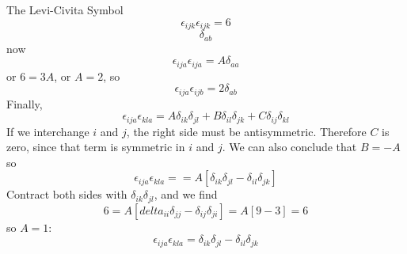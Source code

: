 \documentclass[a4paper,twoside,master.tex]{subfiles}
\begin{document}
\begin{ex}
    \begin{note}{The Levi-Civita Symbol}
        \begin{equation}
            \epsilon_{ijk} \epsilon_{ijk} = 6
        \end{equation}
        \begin{equation}
            [\epsilon_{ija} \epsilon_{ijb} = \delta_{ab} A] \delta_{ab}
        \end{equation}
        now
        \begin{equation}
            \epsilon_{ija} \epsilon_{ija} = A \delta_{aa}
        \end{equation}
        or $ 6 = 3A $, or $ A = 2 $, so
        \begin{equation}
            \epsilon_{ija} \epsilon_{ijb} = 2 \delta_{ab}
        \end{equation}
        Finally,
        \begin{equation}
            \epsilon_{ija} \epsilon_{kla} = A \delta_{ik} \delta_{jl} + B \delta_{il} \delta_{jk} + C \delta_{ij} \delta_{kl}
        \end{equation}
        If we interchange $ i $ and $ j $, the right side must be antisymmetric. Therefore $ C $ is zero, since that term is symmetric in $ i $ and $ j $. We can also conclude that $ B = -A $ so 
        \begin{equation}
            \epsilon_{ija} \epsilon_{kla} = = A \left[ \delta_{ik} \delta_{jl} - \delta_{il} \delta_{jk} \right]
        \end{equation}
        Contract both sides with $ \delta_{ik} \delta_{jl} $, and we find
        \begin{equation}
            6 = A \left[delta_{ii} \delta_{jj} - \delta_{ij} \delta_{ji} \right] = A[9 - 3] = 6
        \end{equation}
        so $ A = 1 $:
        \begin{equation}
            \epsilon_{ija} \epsilon_{kla} = \delta_{ik} \delta_{jl} - \delta_{il} \delta_{jk}
        \end{equation}
    \end{note}
\end{ex}
\end{document}
